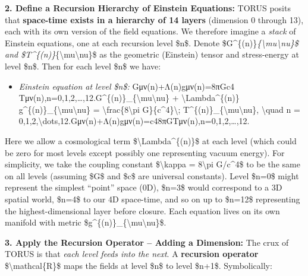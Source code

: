 \documentclass[
]{article}
\begin{document}
\textbf{2. Define a Recursion Hierarchy of Einstein Equations:} TORUS
posits that \textbf{space-time exists in a hierarchy of 14 layers}
(dimension 0 through 13), each with its own version of the field
equations\hspace{0pt}. We therefore imagine a \emph{stack} of Einstein
equations, one at each recursion level \$n\$. Denote
\$G\^{}\{(n)\}\emph{\{\textbackslash mu\textbackslash nu\}\$ and
\$T\^{}\{(n)\}}\{\textbackslash mu\textbackslash nu\}\$ as the geometric
(Einstein) tensor and stress-energy at level \$n\$. Then for each level
\$n\$ we have:

\begin{itemize}
\item
  \emph{Einstein equation at level \$n\$:}
  Gμν(n)+Λ(n)gμν(n)=8πGc4  Tμν(n),n=0,1,2,\ldots,12.G\^{}\{(n)\}\_\{\textbackslash mu\textbackslash nu\}
  + \textbackslash Lambda\^{}\{(n)\}
  g\^{}\{(n)\}\_\{\textbackslash mu\textbackslash nu\} =
  \textbackslash frac\{8\textbackslash pi G\}\{c\^{}4\}\textbackslash;
  T\^{}\{(n)\}\_\{\textbackslash mu\textbackslash nu\},
  \textbackslash quad n =
  0,1,2,\textbackslash dots,12.Gμν(n)\hspace{0pt}+Λ(n)gμν(n)\hspace{0pt}=c48πG\hspace{0pt}Tμν(n)\hspace{0pt},n=0,1,2,\ldots,12.
\end{itemize}

Here we allow a cosmological term \$\textbackslash Lambda\^{}\{(n)\}\$
at each level (which could be zero for most levels except possibly one
representing vacuum energy). For simplicity, we take the coupling
constant \$\textbackslash kappa = 8\textbackslash pi G/c\^{}4\$ to be
the same on all levels (assuming \$G\$ and \$c\$ are universal
constants)\hspace{0pt}. Level \$n=0\$ might represent the simplest
``point'' space (0D), \$n=3\$ would correspond to a 3D spatial world,
\$n=4\$ to our 4D space-time, and so on up to \$n=12\$ representing the
highest-dimensional layer before closure. Each equation lives on its own
manifold with metric
\$g\^{}\{(n)\}\_\{\textbackslash mu\textbackslash nu\}\$.

\textbf{3. Apply the Recursion Operator -- Adding a Dimension:} The crux
of TORUS is that \emph{each level feeds into the next}. A
\textbf{recursion operator} \$\textbackslash mathcal\{R\}\$ maps the
fields at level \$n\$ to level \$n+1\$. Symbolically\hspace{0pt}:
\end{document}
